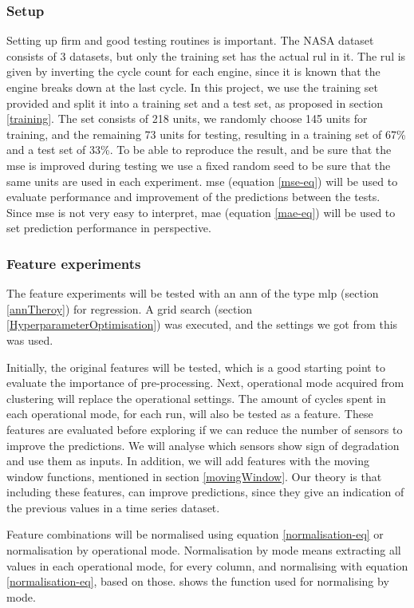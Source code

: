 \documentclass[english, a4paper]{report}
\begin{document}
{{{            \subsubsection{Setup}
            {
                Setting up firm and good testing routines is important. The NASA dataset consists of 3 datasets, but only the training set has the actual \acrfull{rul} in it. The \gls{rul} is given by inverting the cycle count for each engine, since it is known that the engine breaks down at the last cycle. In this project, we use the training set provided and split it into a training set and a test set, as proposed in section \ref{training}.  The set consists of 218 units, we randomly choose 145 units for training, and the remaining 73 units for testing, resulting in a training set of 67\% and a test set of 33\%. To be able to reproduce the result, and be sure that the \gls{mse} is improved during testing we use a fixed random seed to be sure that the same units are used in each experiment. \Gls{mse} (equation \ref{mse-eq}) will be used to evaluate performance and improvement of the predictions between the tests. Since \gls{mse} is not very easy to interpret, \gls{mae} (equation \ref{mae-eq}) will be used to set prediction performance in perspective.  
            }
            
            \subsubsection{Feature experiments}
            {
                The feature experiments will be tested with an \gls{ann} of the type \gls{mlp} (section \ref{annTheroy}) for regression. A grid search (section \ref{HyperparameterOptimisation}) was executed, and the settings we got from this was used.
                \par 
                Initially, the original features will be tested, which is a good starting point to evaluate the importance of pre-processing. Next, operational mode acquired from clustering will replace the operational settings. The amount of cycles spent in each operational mode, for each run, will also be tested as a feature. These features are evaluated before exploring if we can reduce the number of sensors to improve the predictions. We will analyse which sensors show sign of degradation and use them as inputs. In addition, we will add features with the moving window functions, mentioned in section \ref{movingWindow}. Our theory is that including these features, can improve predictions, since they give an indication of the previous values in a time series dataset. \par 
                Feature combinations will be normalised using equation \ref{normalisation-eq} or normalisation by operational mode. Normalisation by mode means extracting all values in each operational mode, for every column, and normalising with equation \ref{normalisation-eq}, based on those.  shows the function used for normalising by mode.
                
}}}}
\end{document}
